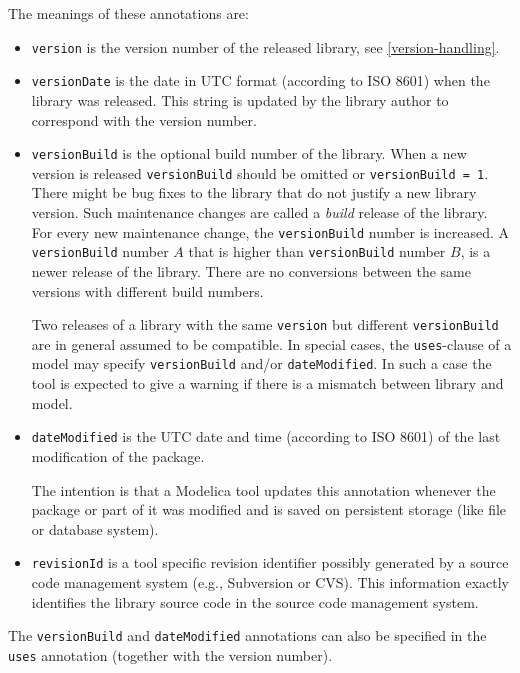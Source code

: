 The meanings of these annotations are:
\begin{itemize}
\item
  \lstinline!version! is the version number of the released library, see \cref{version-handling}.
\item
  \lstinline!versionDate! is the date in UTC format (according to ISO 8601) when the library was released.
  This string is updated by the library author to correspond with the version number.
\item
  \lstinline!versionBuild! is the optional build number of the library.
  When a new version is released \lstinline!versionBuild! should be omitted or \lstinline!versionBuild = 1!.
  There might be bug fixes to the library that do not justify a new library version.
  Such maintenance changes are called a \emph{build} release of the library.
  For every new maintenance change, the \lstinline!versionBuild! number is increased.
  A \lstinline!versionBuild! number $A$ that is higher than \lstinline!versionBuild! number $B$, is a newer release of the library.
  There are no conversions between the same versions with different build numbers.

  Two releases of a library with the same \lstinline!version! but different \lstinline!versionBuild! are in general assumed to be compatible.
  In special cases, the \lstinline!uses!-clause of a model may specify \lstinline!versionBuild! and/or \lstinline!dateModified!.
  In such a case the tool is expected to give a warning if there is a mismatch between library and model.
\item
  \lstinline!dateModified! is the UTC date and time (according to ISO 8601) of the last modification of the package.

  \begin{nonnormative}
  The intention is that a Modelica tool updates this annotation whenever the package or part of it was modified and is saved on persistent storage (like file or database system).
  \end{nonnormative}
\item
  \lstinline!revisionId! is a tool specific revision identifier possibly generated by a source code management system (e.g., Subversion or CVS).
  This information exactly identifies the library source code in the source code management system.
\end{itemize}

The \lstinline!versionBuild! and \lstinline!dateModified! annotations can also be specified in the \lstinline!uses! annotation (together with the version number).

